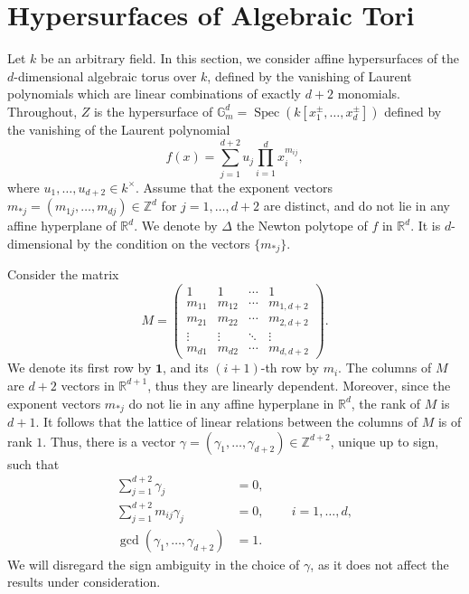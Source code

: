 \documentclass[11pt, reqno]{amsart}
\theoremstyle{plain}
\theoremstyle{definition}
\newcommand{\Z}{\mathbb{Z}}
\newcommand{\R}{\mathbb{R}}
\newcommand{\ga}{\gamma}
\newcommand{\G}{\mathbb{G}}
\newcommand{\Spec}{\operatorname{Spec}}
\begin{document}
\section{Hypersurfaces of Algebraic Tori}\label{section:source-varieties}
Let $k$ be an arbitrary field.
In this section, we consider affine hypersurfaces of the $d$-dimensional algebraic torus over $k$, defined by the vanishing of Laurent polynomials which are linear combinations of exactly $d+2$ monomials. Throughout, $Z$ is the hypersurface of $\G_m^d = \Spec(k[x_1^{\pm},\dots, x_d^{\pm}])$ defined by the vanishing of the Laurent polynomial
\begin{equation}\label{eq:main-laurent-polynomial}
f(x) = \sum_{j=1}^{d+2} u_j \prod_{i=1}^d x_i^{m_{ij}} ,
\end{equation}
where $u_1,\dots,u_{d+2} \in k^\times$. 
Assume that the exponent vectors $m_{*j}=(m_{1j},\dots,m_{dj}) \in \Z^{d}$ for $j=1, \dots , d+2$ are distinct, and do not lie in any affine hyperplane of $\R^{d}$. We denote by $\Delta$ the Newton polytope of $f$ in $\R^{d}$. It is $d$-dimensional by the condition on the vectors $\{m_{*j}\}$.

Consider the matrix
\begin{equation}\label{eq:matrix-M}
M=\begin{pmatrix}
1 & 1 &\cdots &1 \\
m_{11} & m_{12} & \cdots & m_{1,d+2} \\
m_{21} & m_{22} & \cdots & m_{2,d+2} \\
\vdots & \vdots & \ddots & \vdots \\
m_{d1} & m_{d2} & \cdots & m_{d,d+2}
\end{pmatrix}. 
\end{equation}
We denote its first row by $\mathbf{1}$, and its $(i+1)$-th row by $m_i$. The columns of $M$ are $d+2$ vectors in $\R^{d+1}$, thus they are linearly dependent. Moreover, since the exponent vectors $m_{*j}$ do not lie in any affine hyperplane in $\R^{d}$, the rank of $M$ is $d+1$. It follows that the lattice of linear relations between the columns of $M$ is of rank $1$. Thus, there is a vector  $ \gamma =(\gamma_1, \dots, \gamma_{d+2})\in \mathbb{Z}^{d+2}$, unique up to sign, such that  
\begin{align*}
    \sum_{j=1}^{d+2} \gamma_j &= 0, \\
    \sum_{j=1}^{d+2} m_{ij} \gamma_j &= 0 \text{, }\qquad  i = 1, \dots, d , \\
    \gcd(\gamma_1, \dots, \gamma_{d+2}) &= 1 .
\end{align*}
We will disregard the sign ambiguity in the choice of $\ga$, as it does not affect the results under consideration.
\end{document}
